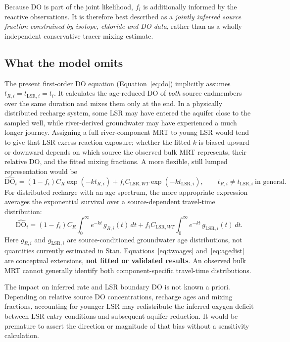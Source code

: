 \documentclass[11pt,a4paper]{article}
\newcommand{\DO}{\mathrm{DO}}
\newcommand{\LSR}{\mathrm{LSR}}
\begin{document}
Because DO is part of the joint likelihood, \(f_i\) is additionally informed by the reactive observations. It is therefore best described as a \emph{jointly inferred source fraction constrained by isotope, chloride and DO data}, rather than as a wholly independent conservative tracer mixing estimate.

\subsection{What the model omits}
The present first-order DO equation (Equation~\eqref{eq:do}) implicitly assumes \(t_{R,i}=t_{\LSR,i}=t_i\). It calculates the age-reduced DO of \emph{both} source endmembers over the same duration and mixes them only at the end. In a physically distributed recharge system, some LSR may have entered the aquifer close to the sampled well, while river-derived groundwater may have experienced a much longer journey. Assigning a full river-component MRT to young LSR would tend to give that LSR excess reaction exposure; whether the fitted $k$ is biased upward or downward depends on which source the observed bulk MRT represents, their relative DO, and the fitted mixing fractions. A more flexible, still lumped representation would be
\begin{equation}
 \widehat{\DO}_i=(1-f_i)C_R\exp(-kt_{R,i})
 +f_iC_{\LSR,WT}\exp(-kt_{\LSR,i}),
 \qquad t_{R,i}\ne t_{\LSR,i}\ \text{in general}.
 \label{eq:twoages}
\end{equation}
For distributed recharge with an age spectrum, the more appropriate expression averages the exponential survival over a source-dependent travel-time distribution:
\begin{equation}
 \widehat{\DO}_i=(1-f_i)C_R\!\int_0^\infty e^{-kt}\,g_{R,i}(t)\,dt
 +f_iC_{\LSR,WT}\!\int_0^\infty e^{-kt}\,g_{\LSR,i}(t)\,dt.
 \label{eq:agedist}
\end{equation}
Here \(g_{R,i}\) and \(g_{\LSR,i}\) are source-conditioned groundwater age distributions, not quantities currently estimated in Stan. Equations~\eqref{eq:twoages} and~\eqref{eq:agedist} are conceptual extensions, \textbf{not fitted or validated results}. An observed bulk MRT cannot generally identify both component-specific travel-time distributions.

The impact on inferred rate and LSR boundary DO is not known a priori. Depending on relative source DO concentrations, recharge ages and mixing fractions, accounting for younger LSR may redistribute the inferred oxygen deficit between LSR entry conditions and subsequent aquifer reduction. It would be premature to assert the direction or magnitude of that bias without a sensitivity calculation.
\end{document}
